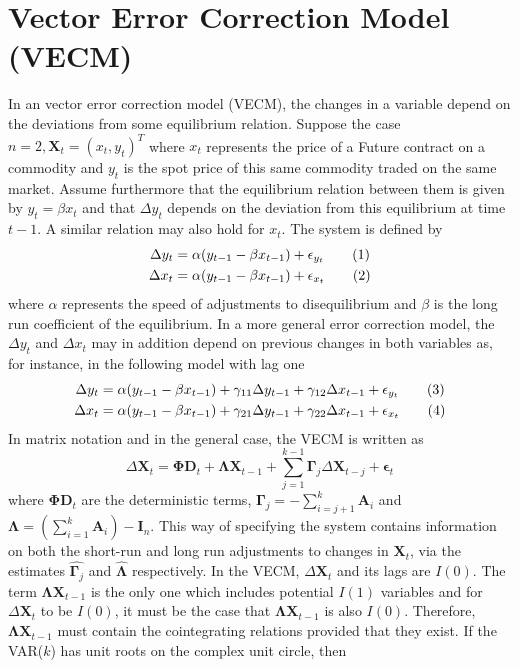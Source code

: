 \documentclass[11pt,a4,twosided,singlespacing,titlepagenumber=on]{scrreprt}
\numberwithin{equation}{chapter} %
\theoremstyle{remark}
\newcommand{\matr}[1]{\mathbf{#1}}
\newcommand\numberthis{\addtocounter{equation}{1}\tag{\theequation}}
\begin{document}
\section{Vector Error Correction Model (VECM)}
In an vector error correction model (VECM), the changes in a variable depend on the deviations from some equilibrium relation. Suppose the case $n=2, \matr{X}_t = (x_t, y_t)^T$ where $x_t$ represents the price of a Future contract on a commodity and $y_t$ is the spot price of this same commodity traded on the same market. Assume furthermore that the equilibrium relation between them is given by $y_t = \beta x_t$ and that $\Delta y_t$ depends on the deviation from this equilibrium at time $t-1$. A similar relation may also hold for $x_t$. The system is defined by
\begin{align*}
\Delta y_t &= \alpha (y_{t-1} - \beta x_{t-1}) + \epsilon_{y_t} \numberthis \\
\Delta x_t &= \alpha (y_{t-1} - \beta x_{t-1}) + \epsilon_{x_t} \numberthis
\end{align*}
where $\alpha$ represents the speed of adjustments to disequilibrium and $\beta$ is the long run coefficient of the equilibrium. In a more general error correction model, the $\Delta y_t$ and $\Delta x_t$ may in addition depend on previous changes in both variables as, for instance, in the following model with lag one
\begin{align*}
\Delta y_t &= \alpha (y_{t-1} - \beta x_{t-1}) + \gamma_{11} \Delta y_{t-1} + \gamma_{12} \Delta x_{t-1} + \epsilon_{y_t} \numberthis \\
\Delta x_t &= \alpha (y_{t-1} - \beta x_{t-1}) + \gamma_{21} \Delta y_{t-1} + \gamma_{22} \Delta x_{t-1} + \epsilon_{x_t} \numberthis
\end{align*}
In matrix notation and in the general case, the VECM is written as
\begin{equation}
\Delta \matr{X}_t = \matr{\Phi} \matr{D}_t + \matr{\Lambda} \matr{X}_{t-1} + \sum_{j=1}^{k-1} \matr{\Gamma}_j \Delta \matr{X}_{t-j} + \matr{\epsilon}_t
\end{equation}
where $\matr{\Phi} \matr{D}_t$ are the deterministic terms, $\matr{\Gamma}_j = - \sum_{i=j+1}^k \matr{A}_i$ and $\matr{\Lambda} = \left(\sum_{i=1}^k \matr{A}_i \right) - \matr{I}_n$. This way of specifying the system contains information on both the short-run and long run adjustments to changes in $\matr{X}_t$, via the estimates $\hat{\matr{\Gamma}_j}$ and $\hat{\matr{\Lambda}}$ respectively. In the VECM, $\Delta \matr{X}_t$ and its lags are $I(0)$. The term $\matr{\Lambda} \matr{X}_{t-1}$ is the only one which includes potential $I(1)$ variables and for $\Delta \matr{X}_t$ to be $I(0)$, it must be the case that $\matr{\Lambda} \matr{X}_{t-1}$ is also $I(0)$. Therefore, $\matr{\Lambda} \matr{X}_{t-1}$ must contain the cointegrating relations provided that they exist. If the VAR($k$) has unit roots on the complex unit circle, then 
\end{document}
